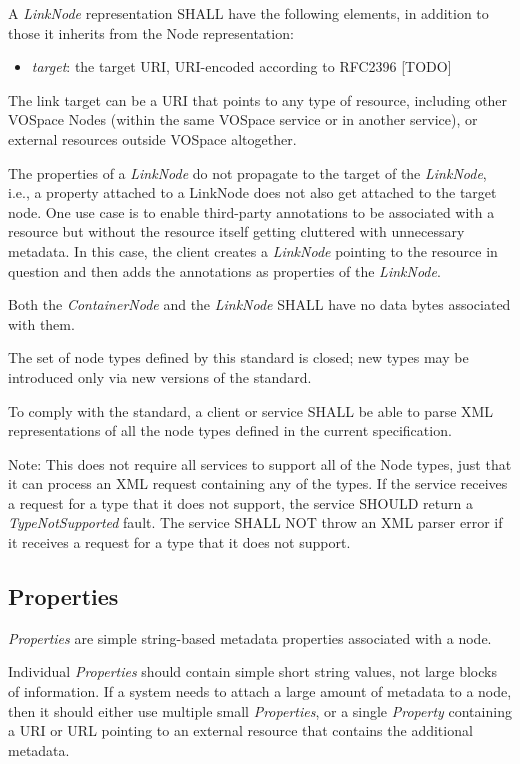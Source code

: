 \documentclass[11pt,a4paper]{ivoa}
\begin{document}
A \emph{LinkNode} representation SHALL have the following elements, in addition to those it inherits from the Node representation:

\begin{itemize}
    \item \emph{target}: the target URI, URI-encoded according to RFC2396 [TODO]
\end{itemize}

The link target can be a URI that points to any type of resource, including other VOSpace Nodes (within the same VOSpace service or in another service), or external resources outside VOSpace altogether.

The properties of a \emph{LinkNode} do not propagate to the target of the \emph{LinkNode}, i.e., a property attached to a LinkNode does not also get attached to the target node. One use case is to enable third-party annotations to be associated with a resource but without the resource itself getting cluttered with unnecessary metadata. In this case, the client creates a \emph{LinkNode} pointing to the resource in question and then adds the annotations as properties of the \emph{LinkNode}.

Both the \emph{ContainerNode} and the \emph{LinkNode} SHALL have no data bytes associated with them.

The set of node types defined by this standard is closed; new types may be introduced only via new versions of the standard.

To comply with the standard, a client or service SHALL be able to parse XML representations of all the node types defined in the current specification.

Note: This does not require all services to support all of the Node types, just that it can process an XML request containing any of the types. If the service receives a request for a type that it does not support, the service SHOULD return a \emph{TypeNotSupported} fault. The service SHALL NOT throw an XML parser error if it receives a request for a type that it does not support.

\subsection{Properties}
\emph{Properties} are simple string-based metadata properties associated with a node.

Individual \emph{Properties} should contain simple short string values, not large blocks of information. If a system needs to attach a large amount of metadata to a node, then it should either use multiple small \emph{Properties}, or a single \emph{Property} containing a URI or URL pointing to an external resource that contains the additional metadata.
\end{document}
